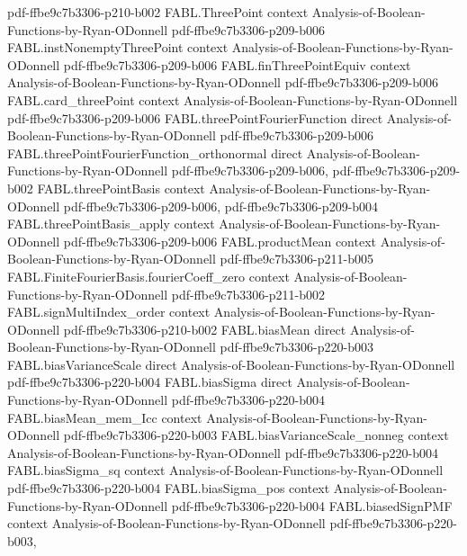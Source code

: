 \begin{theorem}
  {pdf-ffbe9c7b3306-p210-b002}
\proofstep
  {FABL.ThreePoint}
  {context}
  {Analysis-of-Boolean-Functions-by-Ryan-ODonnell}
  {pdf-ffbe9c7b3306-p209-b006}
\proofstep
  {FABL.instNonemptyThreePoint}
  {context}
  {Analysis-of-Boolean-Functions-by-Ryan-ODonnell}
  {pdf-ffbe9c7b3306-p209-b006}
\proofstep
  {FABL.finThreePointEquiv}
  {context}
  {Analysis-of-Boolean-Functions-by-Ryan-ODonnell}
  {pdf-ffbe9c7b3306-p209-b006}
\proofstep
  {FABL.card_threePoint}
  {context}
  {Analysis-of-Boolean-Functions-by-Ryan-ODonnell}
  {pdf-ffbe9c7b3306-p209-b006}
\proofstep
  {FABL.threePointFourierFunction}
  {direct}
  {Analysis-of-Boolean-Functions-by-Ryan-ODonnell}
  {pdf-ffbe9c7b3306-p209-b006}
\proofstep
  {FABL.threePointFourierFunction_orthonormal}
  {direct}
  {Analysis-of-Boolean-Functions-by-Ryan-ODonnell}
  {pdf-ffbe9c7b3306-p209-b006,
    pdf-ffbe9c7b3306-p209-b002}
\proofstep
  {FABL.threePointBasis}
  {context}
  {Analysis-of-Boolean-Functions-by-Ryan-ODonnell}
  {pdf-ffbe9c7b3306-p209-b006,
    pdf-ffbe9c7b3306-p209-b004}
\proofstep
  {FABL.threePointBasis_apply}
  {context}
  {Analysis-of-Boolean-Functions-by-Ryan-ODonnell}
  {pdf-ffbe9c7b3306-p209-b006}
\proofstep
  {FABL.productMean}
  {context}
  {Analysis-of-Boolean-Functions-by-Ryan-ODonnell}
  {pdf-ffbe9c7b3306-p211-b005}
\proofstep
  {FABL.FiniteFourierBasis.fourierCoeff_zero}
  {context}
  {Analysis-of-Boolean-Functions-by-Ryan-ODonnell}
  {pdf-ffbe9c7b3306-p211-b002}
\proofstep
  {FABL.signMultiIndex_order}
  {context}
  {Analysis-of-Boolean-Functions-by-Ryan-ODonnell}
  {pdf-ffbe9c7b3306-p210-b002}
\proofstep
  {FABL.biasMean}
  {direct}
  {Analysis-of-Boolean-Functions-by-Ryan-ODonnell}
  {pdf-ffbe9c7b3306-p220-b003}
\proofstep
  {FABL.biasVarianceScale}
  {direct}
  {Analysis-of-Boolean-Functions-by-Ryan-ODonnell}
  {pdf-ffbe9c7b3306-p220-b004}
\proofstep
  {FABL.biasSigma}
  {direct}
  {Analysis-of-Boolean-Functions-by-Ryan-ODonnell}
  {pdf-ffbe9c7b3306-p220-b004}
\proofstep
  {FABL.biasMean_mem_Icc}
  {context}
  {Analysis-of-Boolean-Functions-by-Ryan-ODonnell}
  {pdf-ffbe9c7b3306-p220-b003}
\proofstep
  {FABL.biasVarianceScale_nonneg}
  {context}
  {Analysis-of-Boolean-Functions-by-Ryan-ODonnell}
  {pdf-ffbe9c7b3306-p220-b004}
\proofstep
  {FABL.biasSigma_sq}
  {context}
  {Analysis-of-Boolean-Functions-by-Ryan-ODonnell}
  {pdf-ffbe9c7b3306-p220-b004}
\proofstep
  {FABL.biasSigma_pos}
  {context}
  {Analysis-of-Boolean-Functions-by-Ryan-ODonnell}
  {pdf-ffbe9c7b3306-p220-b004}
\proofstep
  {FABL.biasedSignPMF}
  {context}
  {Analysis-of-Boolean-Functions-by-Ryan-ODonnell}
  {pdf-ffbe9c7b3306-p220-b003,
}
\end{theorem}
